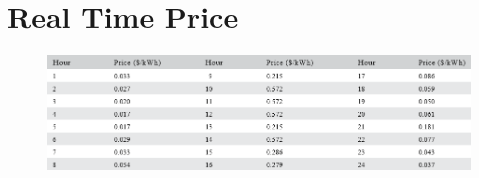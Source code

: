 	\section{Real Time Price}
	
		\begin{figure}[!h]
			\centering
			\includegraphics[width=0.7\linewidth]{Figures/rtp}
			\caption{}
			\label{fig:rtp}
		\end{figure}
	
	